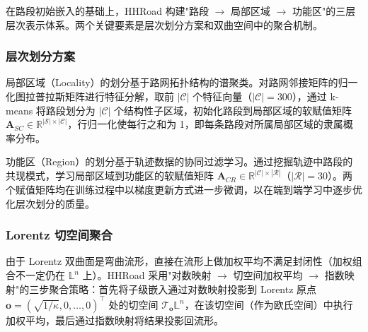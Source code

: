 在路段初始嵌入的基础上，HHRoad 构建"路段 $\to$ 局部区域 $\to$ 功能区"的三层层次表示体系。两个关键要素是层次划分方案和双曲空间中的聚合机制。

\subsubsection{层次划分方案}

局部区域（Locality）的划分基于路网拓扑结构的谱聚类\cite{von2007tutorial}。对路网邻接矩阵的归一化图拉普拉斯矩阵进行特征分解，取前 $|\mathcal{C}|$ 个特征向量（$|\mathcal{C}|=300$），通过 k-means 将路段划分为 $|\mathcal{C}|$ 个结构性子区域，初始化路段到局部区域的软赋值矩阵 $\mathbf{A}_{SC} \in \mathbb{R}^{|\mathcal{S}| \times |\mathcal{C}|}$，行归一化使每行之和为 1，即每条路段对所属局部区域的隶属概率分布。

功能区（Region）的划分基于轨迹数据的协同过滤学习。通过挖掘轨迹中路段的共现模式，学习局部区域到功能区的软赋值矩阵 $\mathbf{A}_{CR} \in \mathbb{R}^{|\mathcal{C}| \times |\mathcal{R}|}$（$|\mathcal{R}|=30$）。两个赋值矩阵均在训练过程中以梯度更新方式进一步微调，以在端到端学习中逐步优化层次划分的质量。

\subsubsection{Lorentz 切空间聚合}

由于 Lorentz 双曲面是弯曲流形，直接在流形上做加权平均不满足封闭性（加权组合不一定仍在 $\mathbb{L}^n$ 上）。HHRoad 采用"对数映射 $\to$ 切空间加权平均 $\to$ 指数映射"的三步聚合策略：首先将子级嵌入通过对数映射投影到 Lorentz 原点 $\mathbf{o} = (\sqrt{1/\kappa}, 0, \ldots, 0)^\top$ 处的切空间 $\mathcal{T}_\mathbf{o}\mathbb{L}^n$，在该切空间（作为欧氏空间）中执行加权平均，最后通过指数映射将结果投影回流形。

